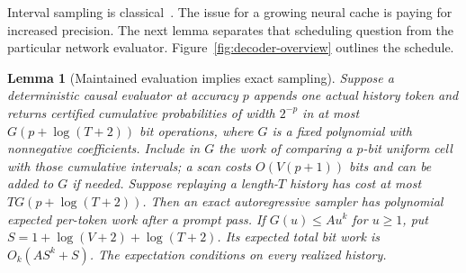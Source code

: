 \documentclass[11pt]{article}
\newtheorem{lemma}[theorem]{Lemma}
\theoremstyle{definition}\newtheorem{definition}[theorem]{Definition}
\theoremstyle{remark}\newtheorem{remark}[theorem]{Remark}
\numberwithin{equation}{section}
\begin{document}
Interval sampling is classical~\cite{han1997interval,brassard2019remote}.
The issue for a growing neural cache is paying for increased precision.
The next lemma separates that scheduling question from the particular
network evaluator. Figure~\ref{fig:decoder-overview} outlines the schedule.



\begin{lemma}[Maintained evaluation implies exact sampling]
\label{lem:conf-replay}
Suppose a deterministic causal evaluator at accuracy $p$ appends one
actual history token and returns certified cumulative probabilities of
width $2^{-p}$ in at most $G(p+\log(T+2))$ bit operations, where $G$
is a fixed polynomial with nonnegative coefficients. Include in $G$ the
work of comparing a $p$-bit uniform cell with those cumulative intervals;
a scan costs $O(V(p+1))$ bits and can be added to $G$ if needed. Suppose replaying
a length-$T$ history has cost at most $T G(p+\log(T+2))$.
Then an exact autoregressive sampler has polynomial expected per-token
work after a prompt pass. If $G(u)\le Au^k$ for $u\ge1$, put $S=1+\log(V+2)+\log(T+2)$. Its expected total bit
work is $O_k(AS^k+S)$. The expectation conditions on every realized history.
\end{lemma}
\end{document}
